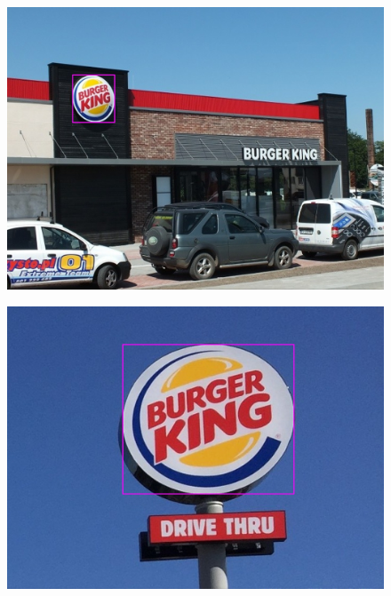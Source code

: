 \begin{figure}[H]
    \centering
    \includegraphics[width=\columnwidth]{figures/results/bk9.jpg}
    \label{fig:result9}
\end{figure}

\begin{figure}[H]
    \centering
    \includegraphics[width=\columnwidth]{figures/results/bk10.jpg}
    \label{fig:result10}
\end{figure}
